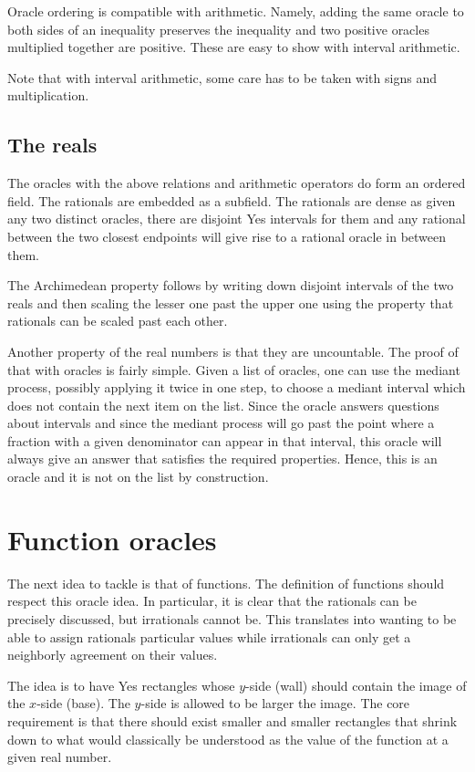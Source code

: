 \documentclass[12pt]{article}
\theoremstyle{remark}
\begin{document}
Oracle ordering is compatible with arithmetic. Namely, adding the same oracle to both sides of an inequality preserves the inequality and two positive oracles multiplied together are positive. These are easy to show with interval arithmetic. 

Note that with interval arithmetic, some care has to be taken with signs and multiplication. 

\subsection{The reals}

The oracles with the above relations and arithmetic operators do form an ordered field. The rationals are embedded as a subfield. The rationals are dense as given any two distinct oracles, there are disjoint Yes intervals for them and any rational between the two closest endpoints will give rise to a rational oracle in between them. 

The Archimedean property follows by  writing down disjoint intervals of the two reals and then scaling the lesser one past the upper one using the property that rationals can be scaled past each other. 

Another property of the real numbers is that they are uncountable. The proof of that with oracles is fairly simple. Given a list of oracles, one can use the mediant process, possibly applying it twice in one step, to choose a mediant interval which does not contain the next item on the list. Since the oracle answers questions about intervals and since the mediant process will go past the point where a fraction with a given denominator can appear in that interval, this oracle will always give an answer that satisfies the required properties.  Hence, this is an oracle and it is not on the list by construction. 

\section{Function oracles}

The next idea to tackle is that of functions. The definition of functions should respect this oracle idea.  In particular, it is clear that the rationals can be precisely discussed, but irrationals cannot be. This translates into wanting to be able to assign rationals particular values while irrationals can only get a neighborly agreement on their values. 

The idea is to have Yes rectangles whose $y$-side (wall) should contain the image of the $x$-side (base). The $y$-side is allowed to be larger the image. The core requirement is that there should exist smaller and smaller rectangles that shrink down to what would classically be understood as the value of the function at a given real number. 
\end{document}
